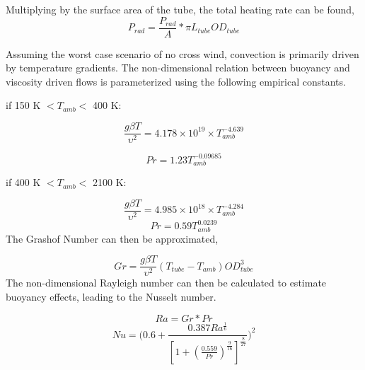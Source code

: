 \documentclass[heading.tex]{subfiles}
\begin{document}
Multiplying by the surface area of the tube, the total heating rate can be found,
\begin{equation*}
P_{rad} =  \frac{P_{rad}}{A} * \pi L_{tube} OD_{tube}
\end{equation*}

Assuming the worst case scenario of no cross wind, convection is primarily driven by temperature gradients. The non-dimensional relation
between buoyancy and viscosity driven flows is parameterized using the following empirical constants. \cite{Berton} \cite{Incropera}

if 150 K $<  T_{amb} <$ 400 K:


\begin{equation*}
\frac{g \beta T} {\upsilon^2} =  4.178\times10^{19} \times T_{amb}^{-4.639}
\end{equation*}

\begin{equation*}
Pr = 1.23 T_{amb}^{-0.09685}
\end{equation*}

if 400 K $<  T_{amb}  <$ 2100 K:


\begin{equation*}
\frac{g \beta T} {\upsilon^2}  = 4.985\times10^{18} \times T_{amb}^{-4.284}
\end{equation*}
\begin{equation*}
Pr = 0.59 T_{amb}^{0.0239}
\end{equation*}
The Grashof Number can then be approximated,


\begin{equation*}
Gr = \frac{g \beta T} {\upsilon^2}  (T_{tube}-T_{amb}) {OD}_{tube}^3
\end{equation*}
The non-dimensional Rayleigh number can then be calculated to estimate buoyancy effects, leading to the Nusselt number.


\begin{equation*}
Ra = Gr * Pr
\end{equation*}
\begin{equation*}
Nu = \Bigg(0.6 + \frac{0.387Ra^{\frac{1}{6}}}{[1+(\frac{0.559}{Pr})^{\frac{9}{16}}]^{\frac{8}{27}}}\Bigg)^2
\end{equation*}
\end{document}
